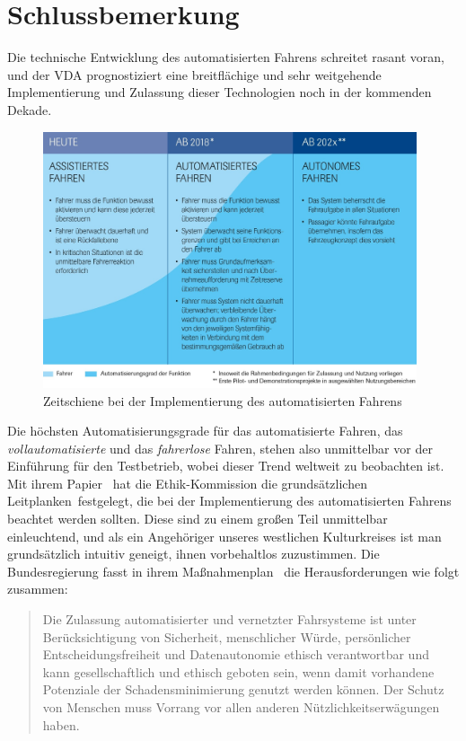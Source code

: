 \documentclass[twoside,a4paper,12pt]{article}
\begin{document}
\newpage

\section{Schlussbemerkung}

Die technische Entwicklung des automatisierten Fahrens schreitet rasant voran, und der VDA prognostiziert eine breitflächige und sehr weitgehende Implementierung
und Zulassung dieser Technologien noch in der kommenden Dekade.\\

\begin{figure}[H]
\centering
\includegraphics[width=11cm]{resources/zeitschiene-automatisierungsgrade.jpg}
\caption[Zeitschiene bei der Implementierung des automatisierten Fahrens]{Zeitschiene bei der Implementierung des automatisierten Fahrens~\cite{vda}}
\label{figure:ZeitschieneAutomatisierungsgrade}
\end{figure}

Die höchsten Automatisierungsgrade für das automatisierte Fahren, das \textit{vollautomatisierte} und das \textit{fahrerlose} Fahren, stehen also unmittelbar
vor der Einführung für den Testbetrieb, wobei dieser Trend weltweit zu beobachten ist.
Mit ihrem Papier~\cite{ek} hat die Ethik-Kommission die grundsätzlichen \glqq Leitplanken\grqq\ festgelegt, die bei der Implementierung des automatisierten Fahrens
beachtet werden sollten. Diese sind zu einem großen Teil unmittelbar einleuchtend, und als ein Angehöriger unseres westlichen Kulturkreises ist man grundsätzlich
intuitiv geneigt, ihnen vorbehaltlos zuzustimmen. Die Bundesregierung fasst in ihrem Maßnahmenplan~\cite{bmvi5} die Herausforderungen wie folgt zusammen:

\begin{quote}
\glqq
Die Zulassung automatisierter und vernetzter Fahrsysteme ist unter Berücksichtigung von Sicherheit, menschlicher Würde, persönlicher Entscheidungsfreiheit und Datenautonomie ethisch verantwortbar und kann gesellschaftlich und ethisch geboten sein, wenn damit vorhandene Potenziale der Schadensminimierung genutzt werden können. Der Schutz von Menschen muss Vorrang vor allen anderen Nützlichkeitserwägungen haben.\grqq\mbox{~\cite[S. 3]{bmvi5}}
\end{quote}
\end{document}
